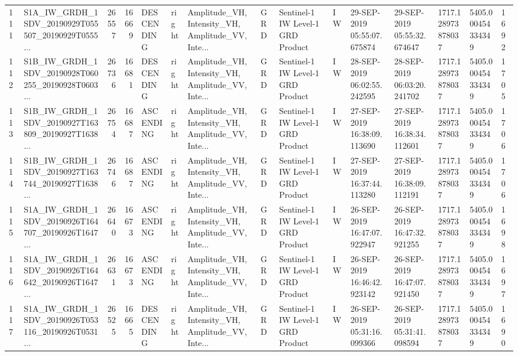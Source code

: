 \begin{tabular}{llrrlllllllllll}
111 &  S1A\_IW\_GRDH\_1SDV\_20190929T055507\_20190929T0555... &  26557 &   16669 &  DESCENDING &  right &  Amplitude\_VH, Intensity\_VH, Amplitude\_VV, Inte... &          GRD &  Sentinel-1 IW Level-1 GRD Product &              IW &  29-SEP-2019 05:55:07.675874 &  29-SEP-2019 05:55:32.674647 &          1717.128973878037 &  5405.000454334349 &       1692 \\
112 &  S1B\_IW\_GRDH\_1SDV\_20190928T060255\_20190928T0603... &  26736 &   16681 &  DESCENDING &  right &  Amplitude\_VH, Intensity\_VH, Amplitude\_VV, Inte... &          GRD &  Sentinel-1 IW Level-1 GRD Product &              IW &  28-SEP-2019 06:02:55.242595 &  28-SEP-2019 06:03:20.241702 &          1717.128973878037 &  5405.000454334349 &       1705 \\
113 &  S1B\_IW\_GRDH\_1SDV\_20190927T163809\_20190927T1638... &  26754 &   16687 &   ASCENDING &  right &  Amplitude\_VH, Intensity\_VH, Amplitude\_VV, Inte... &          GRD &  Sentinel-1 IW Level-1 GRD Product &              IW &  27-SEP-2019 16:38:09.113690 &  27-SEP-2019 16:38:34.112601 &          1717.128973878037 &  5405.000454334349 &       1706 \\
114 &  S1B\_IW\_GRDH\_1SDV\_20190927T163744\_20190927T1638... &  26746 &   16687 &   ASCENDING &  right &  Amplitude\_VH, Intensity\_VH, Amplitude\_VV, Inte... &          GRD &  Sentinel-1 IW Level-1 GRD Product &              IW &  27-SEP-2019 16:37:44.113280 &  27-SEP-2019 16:38:09.112191 &          1717.128973878037 &  5405.000454334349 &       1706 \\
115 &  S1A\_IW\_GRDH\_1SDV\_20190926T164707\_20190926T1647... &  26640 &   16673 &   ASCENDING &  right &  Amplitude\_VH, Intensity\_VH, Amplitude\_VV, Inte... &          GRD &  Sentinel-1 IW Level-1 GRD Product &              IW &  26-SEP-2019 16:47:07.922947 &  26-SEP-2019 16:47:32.921255 &          1717.128973878037 &  5405.000454334349 &       1698 \\
116 &  S1A\_IW\_GRDH\_1SDV\_20190926T164642\_20190926T1647... &  26631 &   16673 &   ASCENDING &  right &  Amplitude\_VH, Intensity\_VH, Amplitude\_VV, Inte... &          GRD &  Sentinel-1 IW Level-1 GRD Product &              IW &  26-SEP-2019 16:46:42.923142 &  26-SEP-2019 16:47:07.921450 &          1717.128973878037 &  5405.000454334349 &       1697 \\
117 &  S1A\_IW\_GRDH\_1SDV\_20190926T053116\_20190926T0531... &  26525 &   16665 &  DESCENDING &  right &  Amplitude\_VH, Intensity\_VH, Amplitude\_VV, Inte... &          GRD &  Sentinel-1 IW Level-1 GRD Product &              IW &  26-SEP-2019 05:31:16.099366 &  26-SEP-2019 05:31:41.098594 &          1717.128973878037 &  5405.000454334349 &       1690 \\

\end{tabular}
